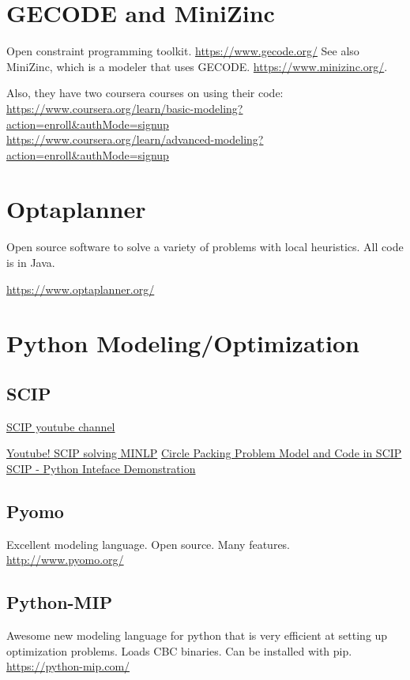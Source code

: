 \documentclass[letter,12pt]{book}
\renewcommand{\0}{\mathbf{0}}
\begin{document}
	


\section{GECODE and MiniZinc}
Open constraint programming toolkit.
\url{https://www.gecode.org/}
See also MiniZinc, which is a modeler that uses GECODE.
\url{https://www.minizinc.org/}.

Also, they have two coursera courses on using their code:
\url{https://www.coursera.org/learn/basic-modeling?action=enroll&authMode=signup}\\
\url{https://www.coursera.org/learn/advanced-modeling?action=enroll&authMode=signup}


\section{Optaplanner}
Open source software to solve a variety of problems with local heuristics.  All code is in Java.  

\url{https://www.optaplanner.org/}
\section{Python Modeling/Optimization}
\subsection{SCIP}
\href{https://www.youtube.com/channel/UCpu5Kj1Q9SQ1kZ1QlwsurAQ}{SCIP youtube channel}

\href{https://www.youtube.com/watch?v=FFqGzckSRW4}{Youtube! SCIP solving MINLP}
\href{https://youtu.be/FFqGzckSRW4?t=734}{Circle Packing Problem Model and Code in SCIP}
\href{https://www.youtube.com/watch?v=7SvapoXVYq0}{SCIP - Python Inteface Demonstration}

\subsection{Pyomo}
Excellent modeling language.  Open source.  Many features.
\url{http://www.pyomo.org/}

\subsection{Python-MIP}
Awesome new modeling language for python that is very efficient at setting up optimization problems.  Loads CBC binaries.  Can be installed with pip.
\url{https://python-mip.com/}
\end{document}
